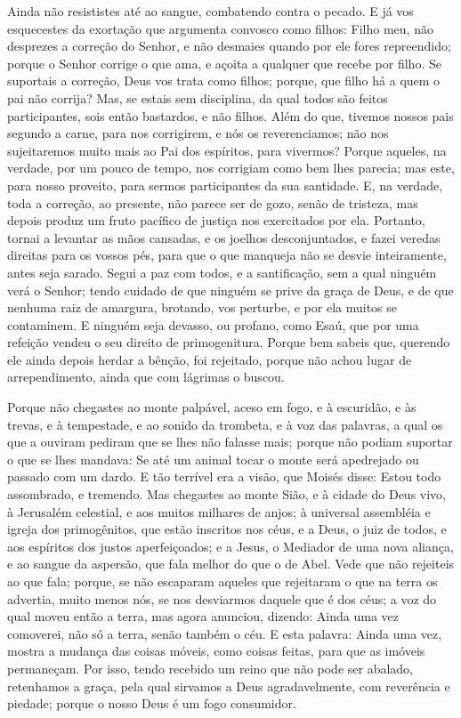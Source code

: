 Ainda não resististes até ao sangue, combatendo contra o pecado.
E já vos esquecestes da exortação que argumenta convosco como
filhos: Filho meu, não desprezes a correção do Senhor, e não
desmaies quando por ele fores repreendido; porque o Senhor
corrige o que ama, e açoita a qualquer que recebe por filho. Se
suportais a correção, Deus vos trata como filhos; porque, que filho
há a quem o pai não corrija? Mas, se estais sem disciplina, da
qual todos são feitos participantes, sois então bastardos, e não
filhos. Além do que, tivemos nossos pais segundo a carne, para
nos corrigirem, e nós os reverenciamos; não nos sujeitaremos muito
mais ao Pai dos espíritos, para vivermos? Porque aqueles, na
verdade, por um pouco de tempo, nos corrigiam como bem lhes parecia;
mas este, para nosso proveito, para sermos participantes da sua
santidade. E, na verdade, toda a correção, ao presente, não
parece ser de gozo, senão de tristeza, mas depois produz um fruto
pacífico de justiça nos exercitados por ela. Portanto, tornai
a levantar as mãos cansadas, e os joelhos desconjuntados, e
fazei veredas direitas para os vossos pés, para que o que manqueja
não se desvie inteiramente, antes seja sarado. Segui a paz
com todos, e a santificação, sem a qual ninguém verá o Senhor;
tendo cuidado de que ninguém se prive da graça de Deus, e de
que nenhuma raiz de amargura, brotando, vos perturbe, e por ela
muitos se contaminem. E ninguém seja devasso, ou profano,
como Esaú, que por uma refeição vendeu o seu direito de
primogenitura. Porque bem sabeis que, querendo ele ainda
depois herdar a bênção, foi rejeitado, porque não achou lugar de
arrependimento, ainda que com lágrimas o buscou.

Porque não chegastes ao monte palpável, aceso em fogo, e à
escuridão, e às trevas, e à tempestade, e ao sonido da
trombeta, e à voz das palavras, a qual os que a ouviram pediram que
se lhes não falasse mais; porque não podiam suportar o que se
lhes mandava: Se até um animal tocar o monte será apedrejado ou
passado com um dardo. E tão terrível era a visão, que Moisés
disse: Estou todo assombrado, e tremendo. Mas chegastes ao
monte Sião, e à cidade do Deus vivo, à Jerusalém celestial, e aos
muitos milhares de anjos; à universal assembléia e igreja dos
primogênitos, que estão inscritos nos céus, e a Deus, o juiz de
todos, e aos espíritos dos justos aperfeiçoados; e a Jesus, o
Mediador de uma nova aliança, e ao sangue da aspersão, que fala
melhor do que o de Abel. Vede que não rejeiteis ao que fala;
porque, se não escaparam aqueles que rejeitaram o que na terra os
advertia, muito menos nós, se nos desviarmos daquele que é dos céus;
a voz do qual moveu então a terra, mas agora anunciou,
dizendo: Ainda uma vez comoverei, não só a terra, senão também o
céu. E esta palavra: Ainda uma vez, mostra a mudança das
coisas móveis, como coisas feitas, para que as imóveis permaneçam.
Por isso, tendo recebido um reino que não pode ser abalado,
retenhamos a graça, pela qual sirvamos a Deus agradavelmente, com
reverência e piedade; porque o nosso Deus é um fogo
consumidor.

